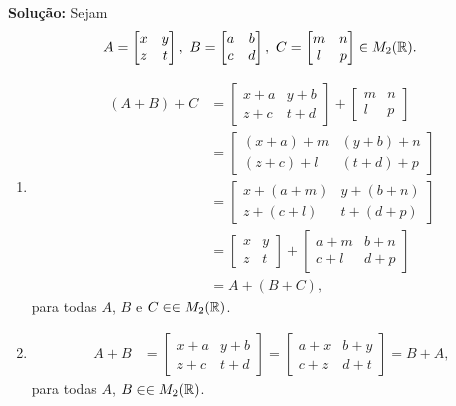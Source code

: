 \documentclass[12pt]{exam}
\begin{document}
\noindent\textbf{Solu\c{c}\~ao:} Sejam
\[
    A = \begin{bmatrix}
        x & y\\
        z & t
    \end{bmatrix},\ 
    B = \begin{bmatrix}
        a & b\\
        c & d
    \end{bmatrix},\ 
    C = \begin{bmatrix}
        m & n\\
        l & p
    \end{bmatrix} \in M_2(\real).
\]
\begin{enumerate}[label={\roman*})]
    \item
    \begin{align*}
        (A + B) + C &= \begin{bmatrix}
        x + a & y + b\\z + c & t + d 
    \end{bmatrix} + \begin{bmatrix}
        m & n\\l & p 
    \end{bmatrix}\\ &= \begin{bmatrix}
        (x + a) + m & (y + b) + n\\(z + c) + l & (t + d) + p 
    \end{bmatrix}\\ &= \begin{bmatrix}
        x + (a + m) & y + (b + n)\\z + (c + l) & t + (d + p) 
    \end{bmatrix} \\&= \begin{bmatrix}
        x & y\\
        z & t
    \end{bmatrix} + \begin{bmatrix}
        a + m & b + n\\c + l & d + p 
    \end{bmatrix}\\ &= A + (B + C),
    \end{align*}
    para todas $A$, $B$ e $C \in \in M_2(\mathbb{R})$.

    \item 
    \begin{align*}
        A + B &= 
        \begin{bmatrix}
            x + a & y + b\\z + c & t + d 
        \end{bmatrix} = \begin{bmatrix}
            a + x & b + y\\c + z & d + t
        \end{bmatrix} = B + A,
    \end{align*}
    para todas $A$, $B \in \in M_2(\mathbb{R})$.


\end{enumerate}
\end{document}
